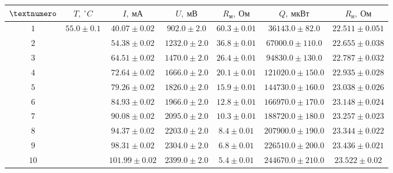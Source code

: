 \begin{tabular}{|c|c|c|c|c|c|c|}
  \hline
  $\textnumero$ & $T,\ ^\circ C$ & $I,\ мА$ & $U,\ мВ$ & $R_м,\ Ом$ & $Q,\ мкВт$ & $R_н,\ Ом$ \\ \hline
  $1$ & \multirow{10}{*}{$55.0 \pm 0.1$} & $40.07 \pm 0.02$ & $902.0 \pm 2.0$ & $60.3 \pm 0.01$ & $36143.0 \pm 82.0$ & $22.511 \pm 0.051$ \\ \cline{1-1} \cline{3-7}
  $2$ & & $54.38 \pm 0.02$ & $1232.0 \pm 2.0$ & $36.8 \pm 0.01$ & $67000.0 \pm 110.0$ & $22.655 \pm 0.038$ \\ \cline{1-1} \cline{3-7}
  $3$ & & $64.51 \pm 0.02$ & $1470.0 \pm 2.0$ & $26.4 \pm 0.01$ & $94830.0 \pm 130.0$ & $22.787 \pm 0.032$ \\ \cline{1-1} \cline{3-7}
  $4$ & & $72.64 \pm 0.02$ & $1666.0 \pm 2.0$ & $20.1 \pm 0.01$ & $121020.0 \pm 150.0$ & $22.935 \pm 0.028$ \\ \cline{1-1} \cline{3-7}
  $5$ & & $79.26 \pm 0.02$ & $1826.0 \pm 2.0$ & $15.9 \pm 0.01$ & $144730.0 \pm 160.0$ & $23.038 \pm 0.026$ \\ \cline{1-1} \cline{3-7}
  $6$ & & $84.93 \pm 0.02$ & $1966.0 \pm 2.0$ & $12.8 \pm 0.01$ & $166970.0 \pm 170.0$ & $23.148 \pm 0.024$ \\ \cline{1-1} \cline{3-7}
  $7$ & & $90.08 \pm 0.02$ & $2095.0 \pm 2.0$ & $10.3 \pm 0.01$ & $188720.0 \pm 180.0$ & $23.257 \pm 0.023$ \\ \cline{1-1} \cline{3-7}
  $8$ & & $94.37 \pm 0.02$ & $2203.0 \pm 2.0$ & $8.4 \pm 0.01$ & $207900.0 \pm 190.0$ & $23.344 \pm 0.022$ \\ \cline{1-1} \cline{3-7}
  $9$ & & $98.31 \pm 0.02$ & $2304.0 \pm 2.0$ & $6.8 \pm 0.01$ & $226510.0 \pm 200.0$ & $23.436 \pm 0.021$ \\ \cline{1-1} \cline{3-7}
  $10$ & & $101.99 \pm 0.02$ & $2399.0 \pm 2.0$ & $5.4 \pm 0.01$ & $244670.0 \pm 210.0$ & $23.522 \pm 0.02$ \\ \hline
\end{tabular}